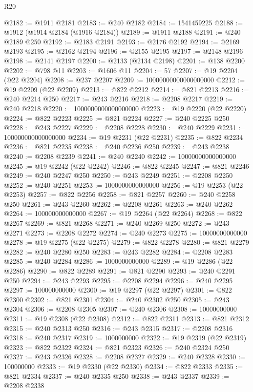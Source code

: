 \begin{lexlean}{R20}
\begin{coremodule}
{@2182 := @1911 @2181
@2183 := @240 @2182
@2184 := 1541459225
@2188 := @1912 (@1914 @2184 (@1916 @2184))
@2189 := @1911 @2188
@2191 := @240 @2189 @250
@2192 := @2183 @2191
@2193 := @2176 @2192
@2194 := @2169 @2193
@2195 := @2162 @2194
@2196 := @2155 @2195
@2197 := @2148 @2196
@2198 := @2141 @2197
@2200 := @2133 (@2134 @2198)
@2201 := @138 @2200
@2202 := @798 @11
@2203 := @1606 @11
@2204 := 57
@2207 := @19 @2204 (@22 @2204)
@2208 := @237 @2207
@2209 := 10000000000000000000
@2212 := @19 @2209 (@22 @2209)
@2213 := @822 @2212
@2214 := @821 @2213
@2216 := @240 @2214 @250
@2217 := @243 @2216
@2218 := @2208 @2217
@2219 := @240 @2218
@2220 := 1000000000000000000
@2223 := @19 @2220 (@22 @2220)
@2224 := @822 @2223
@2225 := @821 @2224
@2227 := @240 @2225 @250
@2228 := @243 @2227
@2229 := @2208 @2228
@2230 := @240 @2229
@2231 := 100000000000000000
@2234 := @19 @2231 (@22 @2231)
@2235 := @822 @2234
@2236 := @821 @2235
@2238 := @240 @2236 @250
@2239 := @243 @2238
@2240 := @2208 @2239
@2241 := @240 @2240
@2242 := 10000000000000000
@2245 := @19 @2242 (@22 @2242)
@2246 := @822 @2245
@2247 := @821 @2246
@2249 := @240 @2247 @250
@2250 := @243 @2249
@2251 := @2208 @2250
@2252 := @240 @2251
@2253 := 1000000000000000
@2256 := @19 @2253 (@22 @2253)
@2257 := @822 @2256
@2258 := @821 @2257
@2260 := @240 @2258 @250
@2261 := @243 @2260
@2262 := @2208 @2261
@2263 := @240 @2262
@2264 := 100000000000000
@2267 := @19 @2264 (@22 @2264)
@2268 := @822 @2267
@2269 := @821 @2268
@2271 := @240 @2269 @250
@2272 := @243 @2271
@2273 := @2208 @2272
@2274 := @240 @2273
@2275 := 10000000000000
@2278 := @19 @2275 (@22 @2275)
@2279 := @822 @2278
@2280 := @821 @2279
@2282 := @240 @2280 @250
@2283 := @243 @2282
@2284 := @2208 @2283
@2285 := @240 @2284
@2286 := 1000000000000
@2289 := @19 @2286 (@22 @2286)
@2290 := @822 @2289
@2291 := @821 @2290
@2293 := @240 @2291 @250
@2294 := @243 @2293
@2295 := @2208 @2294
@2296 := @240 @2295
@2297 := 100000000000
@2300 := @19 @2297 (@22 @2297)
@2301 := @822 @2300
@2302 := @821 @2301
@2304 := @240 @2302 @250
@2305 := @243 @2304
@2306 := @2208 @2305
@2307 := @240 @2306
@2308 := 10000000000
@2311 := @19 @2308 (@22 @2308)
@2312 := @822 @2311
@2313 := @821 @2312
@2315 := @240 @2313 @250
@2316 := @243 @2315
@2317 := @2208 @2316
@2318 := @240 @2317
@2319 := 1000000000
@2322 := @19 @2319 (@22 @2319)
@2323 := @822 @2322
@2324 := @821 @2323
@2326 := @240 @2324 @250
@2327 := @243 @2326
@2328 := @2208 @2327
@2329 := @240 @2328
@2330 := 100000000
@2333 := @19 @2330 (@22 @2330)
@2334 := @822 @2333
@2335 := @821 @2334
@2337 := @240 @2335 @250
@2338 := @243 @2337
@2339 := @2208 @2338
}
\end{coremodule}
\end{lexlean}
